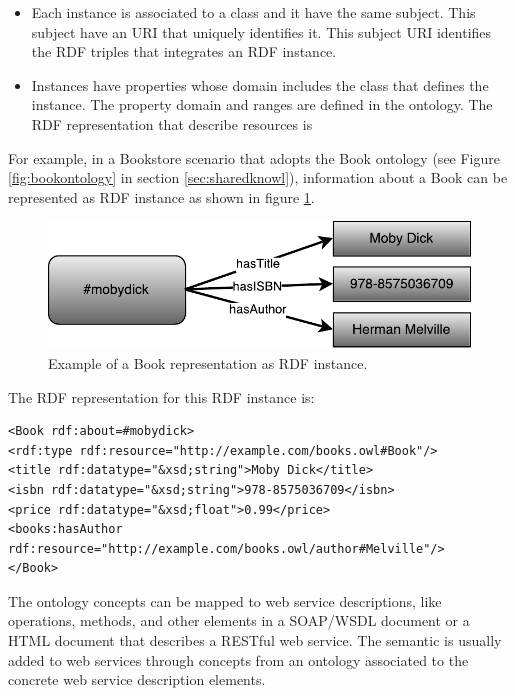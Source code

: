 \documentclass{singlecol-new}
\theoremstyle{TH}{
\newtheorem{lemma}{Lemma}
\newtheorem{theorem}[lemma]{Theorem}
\newtheorem{corrolary}[lemma]{Corrolary}
\newtheorem{conjecture}[lemma]{Conjecture}
\newtheorem{proposition}[lemma]{Proposition}
\newtheorem{claim}[lemma]{Claim}
\newtheorem{stheorem}[lemma]{Wrong Theorem}
\newtheorem{algorithm}{Algorithm}
}
\theoremstyle{THrm}{
\newtheorem{definition}{Definition}[section]
\newtheorem{question}{Question}[section]
\newtheorem{remark}{Remark}
\newtheorem{scheme}{Scheme}
}
\theoremstyle{THhit}{
\newtheorem{case}{Case}[section]
}
\begin{document}
\begin{itemize}
	\item Each instance is associated to a class and it have the same subject. This subject have an URI that uniquely identifies it. This subject URI identifies the RDF triples that integrates an RDF instance.  
	\item Instances have properties whose domain includes the class that defines the instance. The property domain and ranges are defined in the ontology. The RDF representation that describe resources is
\end{itemize}

For example, in a Bookstore scenario that adopts the Book ontology (see Figure \ref{fig:bookontology} in section \ref{sec:sharedknowl}), information about a Book can be represented as RDF instance as shown in figure \ref{fig:bookrdfinstance}.

\begin{figure}[!ht]
	\includegraphics[scale=.7]{images/book-rdf-instance.pdf}
	\centering
	\caption{Example of a Book representation as RDF instance.}
	\label{fig:bookrdfinstance}
\end{figure}

The RDF representation for this RDF instance is:

\begin{lstlisting}[breaklines=true]
<Book rdf:about=#mobydick>
<rdf:type rdf:resource="http://example.com/books.owl#Book"/>
<title rdf:datatype="&xsd;string">Moby Dick</title>
<isbn rdf:datatype="&xsd;string">978-8575036709</isbn>
<price rdf:datatype="&xsd;float">0.99</price>
<books:hasAuthor rdf:resource="http://example.com/books.owl/author#Melville"/>
</Book>
\end{lstlisting}

The ontology concepts can be mapped to web service descriptions, like operations, methods, and other elements in a SOAP/WSDL document or a HTML document that describes a RESTful web service. 
The semantic is usually added to web services through concepts from an ontology associated to the concrete web service description elements.
\end{document}
